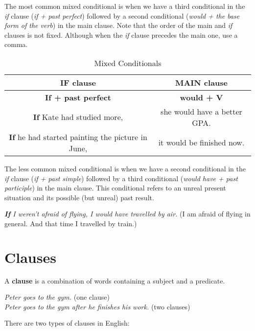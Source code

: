 \documentclass[hidelinks,10pt,a4paper]{article}
\begin{document}
\newpage
The most common mixed conditional is when we have a third conditional in the \textit{if} clause (\textit{if + past perfect}) followed by a second conditional (\textit{would + the base form of the verb}) in the main clause. Note that the order of the main and \textit{if} clauses is not fixed. Although when the \textit{if} clause precedes the main one, use a comma.

\begin{table}[h!]
\begin{center}
\begin{tabular}{|c|c|}
	\hline
	\textbf{IF clause} & \textbf{MAIN clause} \\ \hline
	\textbf{If + past perfect} & \textbf{would + V} \\ \hline
	\textbf{If} Kate had studied more, & she would have a better GPA. \\ \hline
	\textbf{If} he had started painting the picture in June, & it would be finished now. \\ \hline
\end{tabular}
\end{center}
\caption{Mixed Conditionals} \label{tab:mct}
\end{table}
The less common mixed conditional is when we have a second conditional in the \textit{if} clause (\textit{if + past simple}) followed by a third conditional (\textit{would have + past participle}) in the main clause. This conditional refers to an unreal present situation and its possible (but unreal) past result.

\begin{center}
	\textit{\textbf{If} I weren't afraid of flying, I would have travelled by air.} (I am afraid of flying in general. And that time I travelled by train.)
\end{center}

\section{Clauses}

A \textbf{clause} is a combination of words containing a subject and a predicate.

\begin{center}
	\textit{Peter goes to the gym.} (one clause)\\
	\textit{Peter goes to the gym after he finishes his work.} (two clauses)
\end{center}

There are two types of clauses in English:
\end{document}
